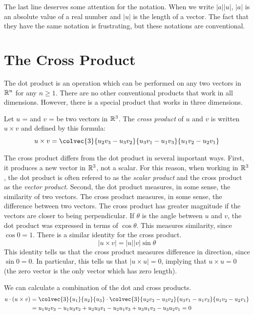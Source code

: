 \documentclass[fleqn,letterpaper]{report}
\begin{document}
The last line deserves some attention for the notation. When
we write $|a| |u|$, $|a|$ is an absolute value of a
real number and $|u|$ is the length of a vector. The fact
that they have the same notation is frustrating, but these
notations are conventional. 

\section{The Cross Product}
\label{cross-product}

The dot product is an operation which can be performed on any
two vectors in $\mathbb{R}^n$ for any $n \geq 1$. 
There are no other conventional products that work
in all dimensions. However, there is a special product
that works in three dimensions. 

\begin{defn}
Let $u$ =  and 
$v$ =  be two 
vectors in $\mathbb{R}^3$. The \emph{cross product} of $u$ and $v$ is
written $u \times v$ and defined by this formula:
\begin{equation*}
u \times v = \colvec{3}{u_2v_3 - u_3v_2}{u_3v_1 - u_1v_3}{u_1v_2 -
u_2v_1}
\end{equation*}
\end{defn}

The cross product differs from the dot product in several
important ways. First, it produces a new vector in $\mathbb{R}^3$,
not a scalar. For this reason, when working in $\mathbb{R}^3$, the
dot product is often refered to as the \emph{scalar product}
and the cross product as the \emph{vector product}. Second,
the dot product measures, in some sense, the similarity of two
vectors. The cross product measures, in some sense, the
difference between two vectors. The cross product has greater
magnitude if the vectors are closer to being perpendicular. If
$\theta$ is the angle between $u$ and $v$, the dot product was
expressed in terms of $\cos \theta$. This measures similarity,
since $\cos 0 = 1$. There is a similar identity for the cross
product.
\begin{equation*}
|u \times v| = |u||v| \sin \theta
\end{equation*}
This identity tells us that the cross product measures
difference in direction, since $\sin 0 = 0$. In particular,
this tells us that $|u \times u| = 0$, implying that $u \times
u = 0$ (the zero vector is the only vector which has zero
length). 

We can calculate a combination of the dot and cross products.
\begin{align*}
u \cdot (u \times v) & = 
\colvec{3}{u_1}{u_2}{u_3} \cdot \colvec{3}{u_2v_3 -
u_3v_2}{u_3v_1 - u_1v_3}{u_1v_2 - u_2v_1} \\
& = u_1u_2v_3 - u_1u_3v_2 + u_2u_3v_1 - u_2u_1v_3 + u_3u_1v_2
- u_3u_2v_1 = 0
\end{align*}
\end{document}

